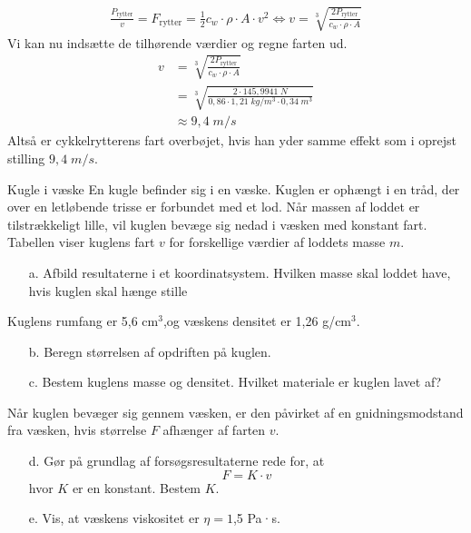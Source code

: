 \documentclass{report}
\begin{document}
\begin{equation*}
\begin{split}
  \frac{P_{\text{rytter} }}{v}=F_{\text{rytter} }=\frac{1}{2} c_w \cdot \rho \cdot A \cdot v^2 \iff v=\sqrt[3]{\frac{2 P_{\text{rytter} }}{c_w \cdot \rho \cdot A}} 
\end{split}
\end{equation*}
Vi kan nu indsætte de tilhørende værdier og regne farten ud.
\begin{equation*}
\begin{split}
  v&=\sqrt[3]{\frac{2 P_{\text{rytter} }}{c_w \cdot \rho \cdot A}} \\
  &=\sqrt[3]{\frac{2 \cdot 145,9941 \;\unit{N} }{0,86 \cdot 1,21 \;\unit{kg/m^3} \cdot 0,34 \;\unit{m^3} }} \\
  &\approx 9,4 \;\unit{m/s} 
\end{split}
\end{equation*}
Altså er cykkelrytterens fart overbøjet, hvis han yder samme effekt som i oprejst stilling $9,4 \;\unit{m/s} $.
\begin{question}{Kugle i væske}{}
  En kugle befinder sig i en væske. 
  Kuglen er ophængt i en tråd, der over en letløbende trisse er forbundet med et lod.
  Når massen af loddet er tilstrækkeligt lille, vil kuglen bevæge sig nedad i væsken med konstant fart. 
  Tabellen viser kuglens fart $v$ for forskellige værdier af loddets masse $m.$
  \begin{itemize}
    \item[a.] Afbild resultaterne i et koordinatsystem. Hvilken masse skal loddet have, hvis kuglen skal hænge stille
  \end{itemize}
  Kuglens rumfang er 5,6 cm$^3$,og væskens densitet er 1,26 g/cm$^3.$
  \begin{itemize}
    \item[b.] Beregn størrelsen af opdriften på kuglen.
    \item[c.] Bestem kuglens masse og densitet. Hvilket materiale er kuglen lavet af?
  \end{itemize}
  Når kuglen bevæger sig gennem væsken, er den påvirket af en gnidningsmodstand fra væsken, hvis størrelse $F$ afhænger af farten $v$.
  \begin{itemize}
    \item[d.] Gør på grundlag af forsøgsresultaterne rede for, at
    $$F=K\cdot v$$  hvor $K$ er en konstant. Bestem $K.$
    \item[e.] Vis, at væskens viskositet er $\eta=1$,5 Pa·s.
  \end{itemize}
\end{question}
\end{document}

